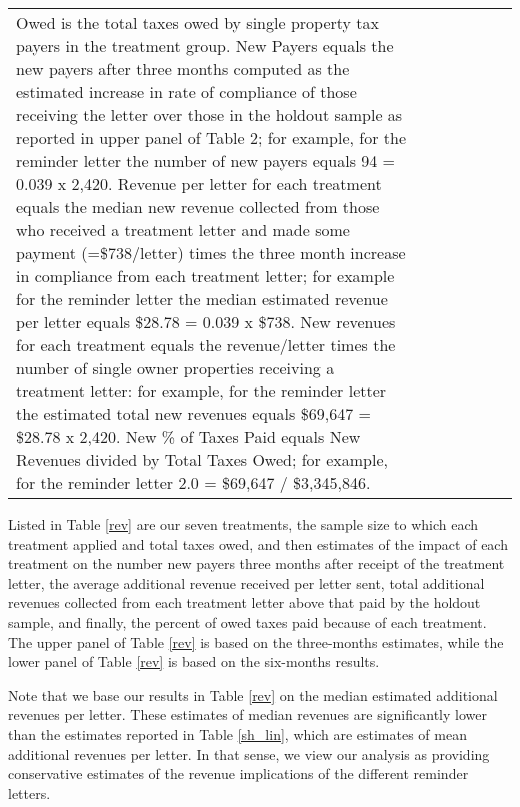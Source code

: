 \documentclass[12pt]{article}
\begin{document}
\begin{table}[htbp]
\begin{tabular}{lcccccc}
{  Owed is the total taxes owed by single property tax payers in the
  treatment group. New Payers equals the new payers after three months
  computed as the estimated increase in rate of compliance of those
  receiving the letter over those in the holdout sample as reported in
  upper panel of Table 2; for example, for the reminder letter the number of new
  payers equals 94 = 0.039 x 2,420.  Revenue per letter for each
  treatment equals the median new revenue collected from those who
  received a treatment letter and made some payment (=\$738/letter)
  times the three month increase in compliance from each treatment
  letter; for example for the reminder letter the median estimated
  revenue per letter equals \$28.78 = 0.039 x \$738.  New revenues for
  each treatment equals the revenue/letter times the number of single
  owner properties receiving a treatment letter: for example, for the
  reminder letter the estimated total new revenues equals \$69,647 =
  \$28.78 x 2,420.  New \% of Taxes Paid equals New Revenues divided by
  Total Taxes Owed; for example, for the reminder letter 2.0 =
  \$69,647 / \$3,345,846.}
\end{tabular}
\end{table}

Listed in Table \ref{rev} are our seven treatments, the sample size to
which each treatment applied and total taxes owed, and then estimates
of the impact of each treatment on the number new payers three months
after receipt of the treatment letter, the average additional revenue
received per letter sent, total additional revenues collected from each
treatment letter above that paid by the holdout sample, and finally,
the percent of owed taxes paid because of each treatment.  The upper
panel of Table \ref{rev} is based on the three-months estimates, while
the lower panel of Table \ref{rev} is based on the six-months results.

Note that we base our results in Table \ref{rev} on the median
estimated additional revenues per letter. These estimates of median
revenues are significantly lower than the estimates reported in Table
\ref{sh_lin}, which are estimates of mean additional revenues per
letter.  In that sense, we view our analysis  as providing
conservative estimates of the revenue implications of the different
reminder letters.
\end{document}
